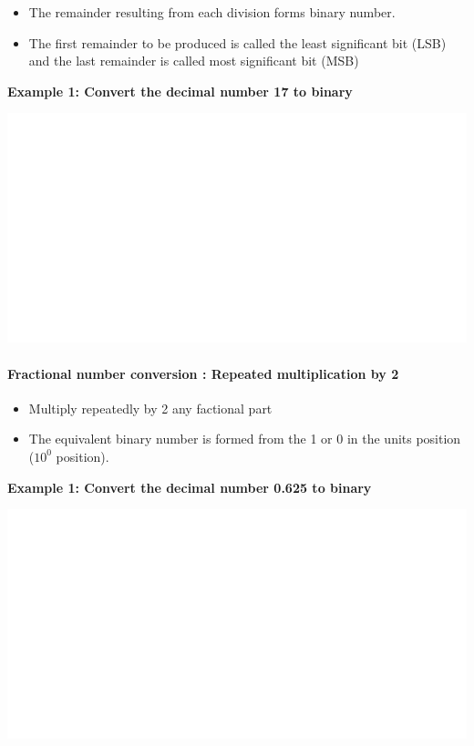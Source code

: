 \documentclass[]{book}
\providecommand{\tightlist}{%
  \setlength{\itemsep}{0pt}\setlength{\parskip}{0pt}}
\let\oldparagraph\paragraph
\renewcommand{\paragraph}[1]{\oldparagraph{#1}\mbox{}}
\begin{document}
\begin{itemize}
\tightlist
\item
  The remainder resulting from each division forms binary number.
\item
  The first remainder to be produced is called the least significant bit (LSB) and the last remainder is called most significant bit (MSB)
\end{itemize}

\textbf{Example 1: Convert the decimal number 17 to binary}

\begin{center}\includegraphics[width=1\linewidth]{figure/NSbox5-1} \end{center}

\hypertarget{fractional-number-conversion-repeated-multiplication-by-2}{%
\paragraph{Fractional number conversion : Repeated multiplication by 2}\label{fractional-number-conversion-repeated-multiplication-by-2}}

\begin{itemize}
\tightlist
\item
  Multiply repeatedly by 2 any factional part
\item
  The equivalent binary number is formed from the 1 or 0 in the units position (\(10^0\) position).
\end{itemize}

\textbf{Example 1: Convert the decimal number 0.625 to binary}

\begin{center}\includegraphics[width=1\linewidth]{figure/NSbox6-1} \end{center}
\end{document}
